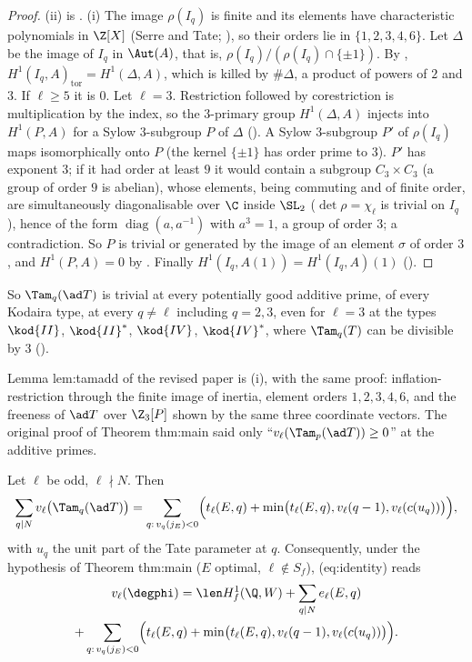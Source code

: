 \begin{proof}
(ii) is . (i) The image $\rho(I_q)$ is finite and its elements have characteristic polynomials in $\Z[X]$ (Serre and Tate; ), so
their orders lie in $\{1,2,3,4,6\}$. Let $\Delta$ be the image of $I_q$ in $\Aut(A)$, that is, $\rho(I_q)/(\rho(I_q)\cap\{\pm1\})$. By ,
$H^1(I_q,A)_{\mathrm{tor}}=H^1(\Delta,A)$, which is killed by $\#\Delta$, a product of powers of $2$ and $3$. If $\ell\ge5$ it is $0$. Let $\ell=3$. Restriction followed by corestriction is
multiplication by the index, so the $3$-primary group $H^1(\Delta,A)$ injects into $H^1(P,A)$ for a Sylow $3$-subgroup $P$ of $\Delta$ (). A Sylow $3$-subgroup $P'$ of
$\rho(I_q)$ maps isomorphically onto $P$ (the kernel $\{\pm1\}$ has order prime to $3$). $P'$ has exponent $3$; if it had order at least $9$ it would contain a subgroup $C_3\times C_3$
(a group of order $9$ is abelian), whose elements, being commuting and of finite order, are simultaneously diagonalisable over $\C$ inside $\SL_2$ ($\det\rho=\chi_\ell$ is trivial
on $I_q$), hence of the form $\operatorname{diag}(a,a^{-1})$ with $a^3=1$, a group of order $3$; a contradiction. So $P$ is trivial or generated by the image of an element $\sigma$ of order
$3$, and $H^1(P,A)=0$ by . Finally $H^1(I_q,A(1))=H^1(I_q,A)(1)$ ().
\end{proof}

So $\Tam_q(\ad T)$ is trivial at every potentially good additive prime, of every Kodaira type, at every $q\ne\ell$ including $q=2,3$, even for $\ell=3$ at the types $\kod{II}$,
$\kod{II}^*$, $\kod{IV}$, $\kod{IV}^*$, where $\Tam_q(T)$ can be divisible by $3$ ().

\begin{paperlink}
Lemma lem:tamadd of the revised paper is (i), with the same proof: inflation-restriction through the finite image of inertia, element orders $1,2,3,4,6$, and the
freeness of $\ad T$ over $\Z_3[P]$ shown by the same three coordinate vectors. The original proof of Theorem thm:main said only ``$v_\ell(\Tam_p(\ad T))\ge0$'' at the
additive primes.
\end{paperlink}

\begin{corollary}\label{cor:blochkato:explicit-identity}
Let $\ell$ be odd, $\ell\nmid N$. Then
\[
\sum_{q\mid N}v_\ell\bigl(\Tam_q(\ad T)\bigr)=\sum_{q:\,v_q(j_E)<0}\Bigl(t_\ell(E,q)+\min\bigl(t_\ell(E,q),v_\ell(q-1),v_\ell(c(u_q))\bigr)\Bigr),
\]
with $u_q$ the unit part of the Tate parameter at $q$. Consequently, under the hypothesis of Theorem thm:main ($E$ optimal, $\ell\notin S_f$), (eq:identity) reads
\begin{multline*}
v_\ell(\degphi)=\len H^1_f(\Q,W)+\sum_{q\mid N}e_\ell(E,q)\\
+\sum_{q:\,v_q(j_E)<0}\Bigl(t_\ell(E,q)+\min\bigl(t_\ell(E,q),v_\ell(q-1),v_\ell(c(u_q))\bigr)\Bigr).
\end{multline*}
\end{corollary}

